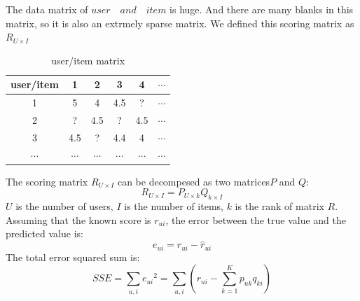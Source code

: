 \documentclass[a4paper, 12pt]{article}
\theoremstyle{definition}
\begin{document}
The data matrix of $user\quad and\quad item$ is huge.  And there are many blanks in this matrix,  so it is also an extrmely sparse matrix.  We defined this scoring matrix as $R_{U\times I}$
\begin{table}[H]
	\label{user/item matrix}
	\caption{user/item matrix}
	\centering
	\begin{tabular}{|c|c|c|c|c|c|}
		\hline 
		user/item&1&2&3&4&$\cdots$ \\ \hline
		1&5&4&4.5&?&$\cdots$ \\ \hline
		2&?&4.5&?&4.5&$\cdots$\\ \hline
		3&4.5&?&4.4&4&$\cdots$\\ \hline
		$\cdots$&$\cdots$&$\cdots$&$\cdots$&$\cdots$ &$\cdots$ \\ \hline
	\end{tabular}
\end{table} 
The scoring matrix $R_{U\times I}$ can be decompesed as two matrices$P$ and $Q$:
\begin{equation}
R_{U \times I}=P_{U\times k}Q_{k\times I}
\end{equation}
$U$ is the number of users,  $I$ is the number of items,  $k$ is the rank of matrix $R$.\\
Assuming that the known score is $r_{ui}$,  the error between the true value and the predicted value is:
\begin{equation}
e_{ui}=r_{ui}-{\widehat{r}}_{ui}
\end{equation} 
The total error squared sum is:
\begin{equation}
SSE=\sum_{u,i}{e_{ui}}^{2}=\sum_{u,i}(r_{ui}-\sum_{k=1}^{K}p_{uk}q_{ki})
\end{equation}
\end{document}

